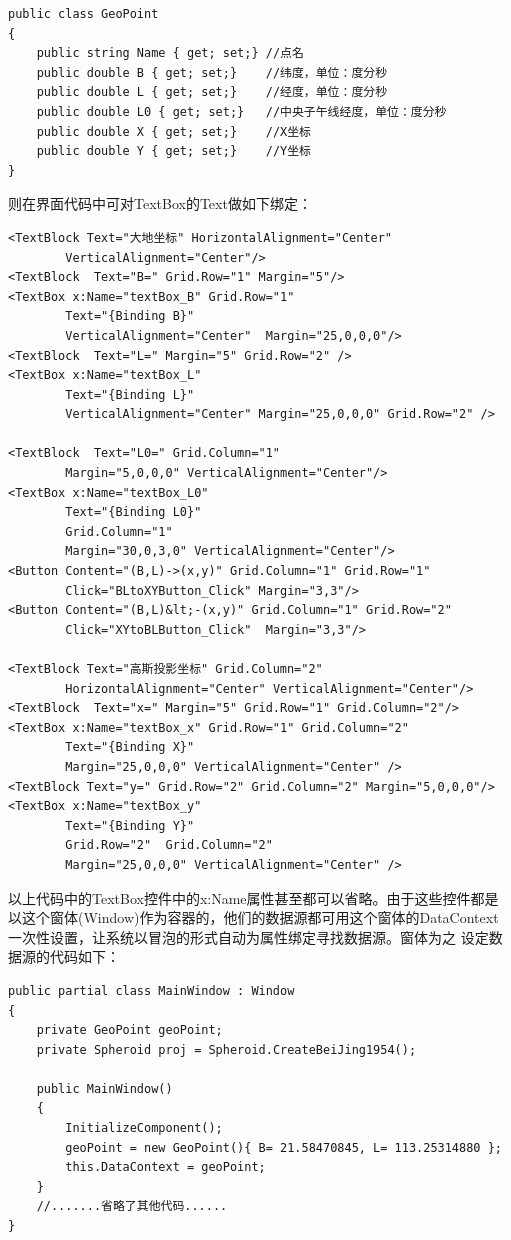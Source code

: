 \begin{lstlisting}
public class GeoPoint
{
    public string Name { get; set;} //点名
    public double B { get; set;}    //纬度，单位：度分秒
    public double L { get; set;}    //经度，单位：度分秒
    public double L0 { get; set;}   //中央子午线经度，单位：度分秒
    public double X { get; set;}    //X坐标
    public double Y { get; set;}    //Y坐标
}
\end{lstlisting}

则在界面代码中可对TextBox的Text做如下绑定：

\begin{lstlisting}
<TextBlock Text="大地坐标" HorizontalAlignment="Center"
        VerticalAlignment="Center"/>
<TextBlock  Text="B=" Grid.Row="1" Margin="5"/>
<TextBox x:Name="textBox_B" Grid.Row="1"
        Text="{Binding B}"
        VerticalAlignment="Center"  Margin="25,0,0,0"/>
<TextBlock  Text="L=" Margin="5" Grid.Row="2" />
<TextBox x:Name="textBox_L"
        Text="{Binding L}"
        VerticalAlignment="Center" Margin="25,0,0,0" Grid.Row="2" />

<TextBlock  Text="L0=" Grid.Column="1"
        Margin="5,0,0,0" VerticalAlignment="Center"/>
<TextBox x:Name="textBox_L0"
        Text="{Binding L0}" 
        Grid.Column="1"
        Margin="30,0,3,0" VerticalAlignment="Center"/>
<Button Content="(B,L)->(x,y)" Grid.Column="1" Grid.Row="1"
        Click="BLtoXYButton_Click" Margin="3,3"/>
<Button Content="(B,L)&lt;-(x,y)" Grid.Column="1" Grid.Row="2"
        Click="XYtoBLButton_Click"  Margin="3,3"/>
        
<TextBlock Text="高斯投影坐标" Grid.Column="2"
        HorizontalAlignment="Center" VerticalAlignment="Center"/>
<TextBlock  Text="x=" Margin="5" Grid.Row="1" Grid.Column="2"/>
<TextBox x:Name="textBox_x" Grid.Row="1" Grid.Column="2"
        Text="{Binding X}"
        Margin="25,0,0,0" VerticalAlignment="Center" />
<TextBlock Text="y=" Grid.Row="2" Grid.Column="2" Margin="5,0,0,0"/>
<TextBox x:Name="textBox_y"
        Text="{Binding Y}"
        Grid.Row="2"  Grid.Column="2"
        Margin="25,0,0,0" VerticalAlignment="Center" />  
\end{lstlisting}

以上代码中的TextBox控件中的x:Name属性甚至都可以省略。由于这些控件都是
以这个窗体(Window)作为容器的，他们的数据源都可用这个窗体的DataContext
一次性设置，让系统以冒泡的形式自动为属性绑定寻找数据源。窗体为之
设定数据源的代码如下：

\begin{lstlisting}
public partial class MainWindow : Window
{
    private GeoPoint geoPoint;
    private Spheroid proj = Spheroid.CreateBeiJing1954();

    public MainWindow()
    {
        InitializeComponent();
        geoPoint = new GeoPoint(){ B= 21.58470845, L= 113.25314880 };
        this.DataContext = geoPoint;
    }
    //.......省略了其他代码......
}
\end{lstlisting}

